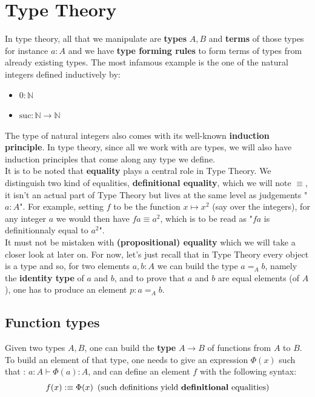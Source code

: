 \documentclass{report}
\begin{document}
\section{Type Theory}
In type theory, all that we manipulate are \textbf{types} $A,B$ and \textbf{terms} of those types for instance $a : A$ and we have \textbf{type forming rules} to form terms of types from already existing types. The most infamous example is the one of the natural integers defined inductively by:
\begin{itemize}
    \item $0 : \mathbb N$
    \item $\mathrm{suc}: \mathbb N \rightarrow \mathbb N$
\end{itemize}
The type of natural integers also comes with its well-known \textbf{induction principle}. In type theory, since all we work with are types, we will also have induction principles that come along any type we define.\\
It is to be noted that \textbf{equality} plays a central role in Type Theory. We distinguish two kind of equalities, \textbf{definitional equality}, which we will note $\equiv$, it isn't an actual part of Type Theory but lives at the same level as judgements "$a : A $". For example, setting $f$ to be the function $x \mapsto x^2 $ (say over the integers), for any integer $a$ we would then have $f a \equiv a^2$, which is to be read as "$f a$ is definitionnaly equal to $a^2$".\\
It must not be mistaken with \textbf{(propositional) equality} which we will take a closer look at later on. For now, let's just recall that in Type Theory every object is a type and so, for two elements $a,b :A$ we can build the type $a =_A b$, namely the \textbf{identity type} of $a$ and $b$, and to prove that $a$ and $b$ are equal elements (of $A$), one has to produce an element $p : a=_A b$.
\subsection{Function types}
Given two types $A,B$, one can build the \textbf{type} $A \rightarrow B$ of functions from $A$ to $B$. To build an element of that type, one needs to give an expression $\Phi(x)$ such that : $a : A \vdash \Phi(a) : A$, and can define an element $f$ with the following syntax: 
$$f(x) :\equiv \Phi(x) \hspace{5pt}\text{(such definitions yield \textbf{definitional} equalities)}$$
\end{document}
